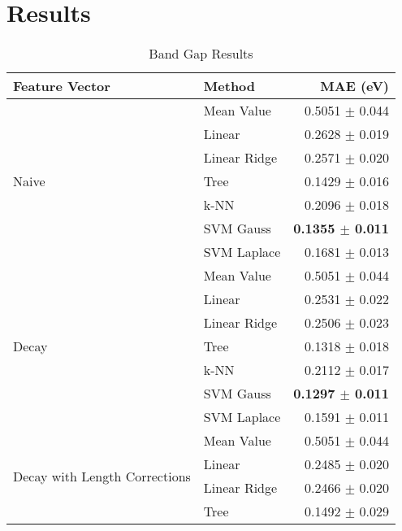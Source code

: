 \documentclass[10pt]{article}
\begin{document}

\newpage
\appendix

\section{Results}

\begin{table}[H]
  \centering
  \caption{Band Gap Results}
  \begin{tabular}{llr}
            Feature Vector     & Method       & MAE (eV)                \\
    \hline\hline
    \multirow{7}{*}{Naive}     & Mean Value   & 0.5051 $\pm$ 0.044 \\
                               & Linear       & 0.2628 $\pm$ 0.019 \\
                               & Linear Ridge & 0.2571 $\pm$ 0.020 \\
                               & Tree         & 0.1429 $\pm$ 0.016 \\
                               & k-NN         & 0.2096 $\pm$ 0.018 \\
                               & SVM Gauss    & \textbf{0.1355 $\pm$ 0.011} \\
                               & SVM Laplace  & 0.1681 $\pm$ 0.013 \\
    \hline
    \multirow{7}{*}{Decay}     & Mean Value   & 0.5051 $\pm$ 0.044 \\
                               & Linear       & 0.2531 $\pm$ 0.022 \\
                               & Linear Ridge & 0.2506 $\pm$ 0.023 \\
                               & Tree         & 0.1318 $\pm$ 0.018 \\
                               & k-NN         & 0.2112 $\pm$ 0.017 \\
                               & SVM Gauss    & \textbf{0.1297 $\pm$ 0.011} \\
                               & SVM Laplace  & 0.1591 $\pm$ 0.011 \\
    \hline
    \multirow{7}{*}{Decay with Length Corrections} & Mean Value   & 0.5051 $\pm$ 0.044 \\
                               & Linear       & 0.2485 $\pm$ 0.020 \\
                               & Linear Ridge & 0.2466 $\pm$ 0.020 \\
                               & Tree         & 0.1492 $\pm$ 0.029 \\

\end{tabular}
\end{table}
\end{document}
